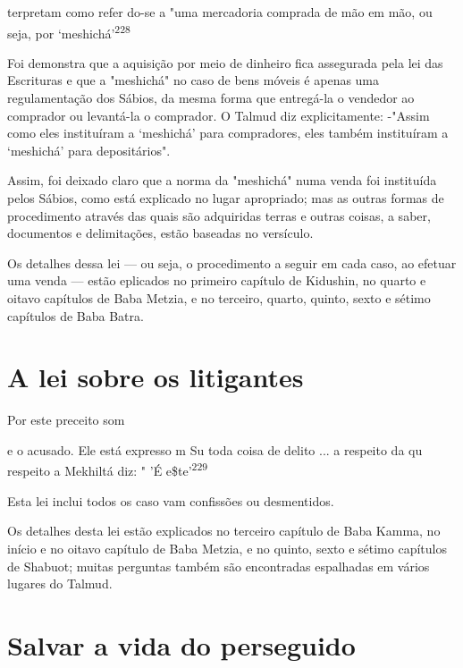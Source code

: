 \begin{itemize}
\begin{enumrate}
\begin{itemize}
\begin{itemize}
\begin{itemize}
terpretam como refer do-se a "uma mercadoria comprada de mão em mão, ou
seja, por `meshichá'\textsuperscript{228}

Foi demonstra que a aquisição por meio de dinheiro fica assegu­rada pela
lei das Escrituras e que a "meshichá" no caso de bens móveis é ape­nas
uma regulamentação dos Sábios, da mesma forma que entregá-la o vende­dor
ao comprador ou levantá-la o comprador. O Talmud diz explicitamente:
-"Assim como eles instituíram a `meshichá' para compradores, eles também
ins­tituíram a `meshichá' para depositários".

Assim, foi deixado claro que a norma da "meshichá" numa venda foi
instituída pelos Sábios, como está explicado no lugar apropriado; mas as
outras formas de procedimento através das quais são adquiridas terras e
outras coisas, a saber, documentos e delimitações, estão baseadas no
versículo.

Os detalhes dessa lei --- ou seja, o procedimento a seguir em cada caso,
ao efetuar uma venda --- estão eplicados no primeiro capítulo de
Kidus­hin, no quarto e oitavo capítulos de Baba Metzia, e no terceiro,
quarto, quinto, sexto e sétimo capítulos de Baba Batra.

\section{A lei sobre os litigantes}

Por este preceito som

e o acusado. Ele está expresso m Su toda coisa de delito ... a respeito
da qu respeito a Mekhiltá diz: " 'É e\$te'\textsuperscript{229}

Esta lei inclui todos os caso vam confissões ou desmentidos.

Os detalhes desta lei estão explicados no terceiro capítulo de Baba
Kamma, no início e no oitavo capítulo de Baba Metzia, e no quinto, sexto
e sétimo capítulos de Shabuot; muitas perguntas também são encontradas
espa­lhadas em vários lugares do Talmud.

\section{Salvar a vida do perseguido}


\end{itemize}
\end{itemize}
\end{itemize}
\end{enumrate}
\end{itemize}
